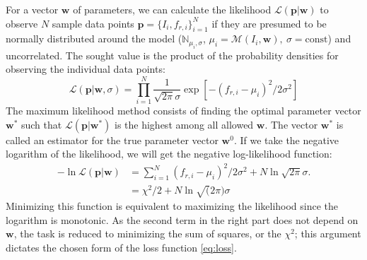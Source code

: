 \documentclass[%
 aip,
 amsmath,amssymb,
 reprint,%
]{revtex4-1}
\begin{document}
	
For a vector $\mathbf{w}$ of parameters, we can calculate the likelihood $ \mathcal{L}(\mathbf{p}|\mathbf{w}) $ to observe $N$ sample data points $\mathbf{p} = \{I_i, f_{r,i}\}_{i=1}^N$ if they are presumed to be normally distributed around the model ($\mathbb{N}_{\mu_i, \sigma}$, $\mu_i = \mathcal{M}(I_i, \mathbf{w}),\ \sigma = \text{const}$) and uncorrelated. The sought value is the product of the probability densities for observing the individual data points:
\begin{equation}
\mathcal{L}(\mathbf{p}|\mathbf{w}, \sigma) = \prod_{i=1}^{N} \frac{1}{\sqrt{2\pi}\sigma} \exp[ -(f_{r,i} - \mu_i)^2 / 2 \sigma^2]\label{eq:MLE} 
\end{equation}
The maximum likelihood method consists of finding the optimal parameter vector $\mathbf{w}^*$ such that $ \mathcal{L}(\mathbf{p}|\mathbf{w}^*) $ is the highest among all allowed $\mathbf{w} $. The vector $\mathbf{w}^*$ is called an estimator for the true parameter vector $\mathbf{w}^0$. If we take the negative logarithm of the likelihood, we will get the negative log-likelihood function:
\begin{align*}
- \ln \mathcal{L}(\mathbf{p}|\mathbf{w}) &= \sum_{i=1}^N (f_{r,i} - \mu_i)^2 / 2 \sigma^2 + N \ln\sqrt{2\pi}\sigma.
\label{eq:logL} \\
&= \chi^2/2 + N\ln \sqrt(2\pi)\sigma
\end{align*}
Minimizing this function is equivalent to maximizing the likelihood since the logarithm is monotonic. As the second term in the right part does not depend on $\mathbf{w}$, the task is reduced to minimizing the sum of squares, or the $\chi^2$; this argument dictates the chosen form of the loss function \eqref{eq:loss}. 
\end{document}
